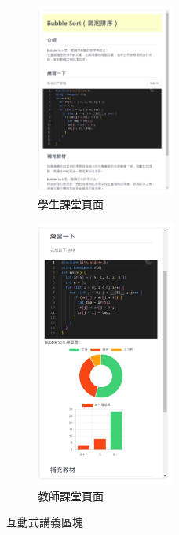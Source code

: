 \begin{figure}[H]
  \begin{subfigure}{0.5\linewidth}
    \centering
    \includegraphics[width=0.5\textwidth]{images/side-s.png}
    \caption{學生課堂頁面}
    \label{fig:student}
  \end{subfigure}
  \begin{subfigure}{0.5\linewidth}
    \centering
    \includegraphics[width=0.5\textwidth]{images/side-t.png}
    \caption{教師課堂頁面}
    \label{fig:teacher}
  \end{subfigure}
  \caption{互動式講義區塊}
\end{figure}

